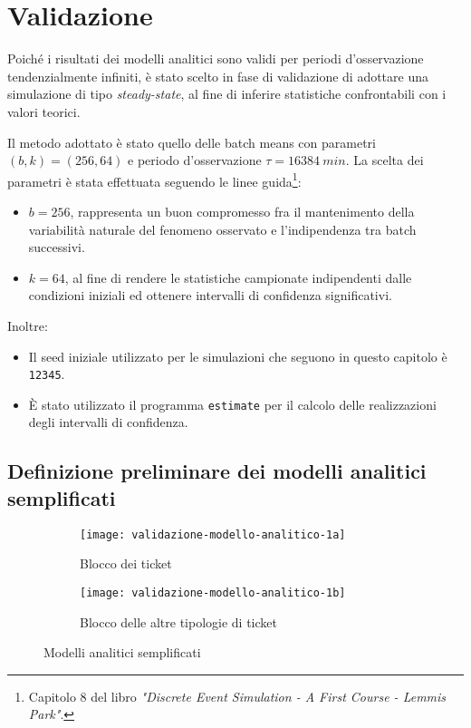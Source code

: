 \chapter{Validazione}\label{chp:validazione}
Poiché i risultati dei modelli analitici sono validi per periodi d'osservazione tendenzialmente infiniti, è stato scelto in fase di validazione di adottare una simulazione di tipo \textit{steady-state}, al fine di inferire statistiche confrontabili con i valori teorici.

Il metodo adottato è stato quello delle batch means con parametri $(b,k) = (256, 64)$ e periodo d'osservazione $\tau = 16384\ min$. La scelta dei parametri è stata effettuata seguendo le linee guida\footnote{Capitolo 8 del libro \textit{"Discrete Event Simulation - A First Course - Lemmis Park"}.}:
\begin{itemize}
\item $b = 256$, rappresenta un buon compromesso fra il mantenimento della variabilità naturale del fenomeno osservato e l'indipendenza tra batch successivi.
\item $k = 64$, al fine di rendere le statistiche campionate indipendenti dalle
condizioni iniziali ed ottenere intervalli di confidenza significativi.
\end{itemize}

Inoltre:
\begin{itemize}
\item Il seed iniziale utilizzato per le simulazioni che seguono in questo capitolo è \texttt{12345}.
\item È stato utilizzato il programma \texttt{estimate} per il calcolo delle realizzazioni degli intervalli di confidenza.
\end{itemize}

\section{Definizione preliminare dei modelli analitici semplificati}
\begin{figure}[ht]
\centering
\begin{subfigure}[b]{0.475\textwidth}  
\centering 
\texttt{[image: validazione-modello-analitico-1a]}
\caption{Blocco dei ticket \sr{}}    
\label{fig:validazione-modello-analitico-1a}
\end{subfigure}
\hfill 
\begin{subfigure}[b]{0.475\textwidth}
\centering
\texttt{[image: validazione-modello-analitico-1b]}
\caption{Blocco delle altre tipologie di ticket}    
\label{fig:validazione-modello-analitico-1b}
\end{subfigure}
\caption{Modelli analitici semplificati}
\label{fig:validazione-modello-analitico-1}
\end{figure}

